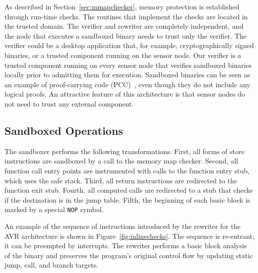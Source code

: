 %
As described in Section~\ref{sec:mmapchecker}, memory protection is
established through run-time checks. 
%
%
The routines that implement the checks are located in the trusted
domain.
%
%
%
The verifier and rewriter are completely independent, and
%
the node that executes a sandboxed binary needs to trust only the
verifier.
%
The verifier could be a desktop application that, for example,
cryptographically signed binaries, or a trusted component running on the
sensor node.
%
%
%
Our verifier is a trusted component running on every sensor
node that verifies sandboxed binaries locally prior to admitting them
for execution.
%
Sandboxed binaries can be seen as an example of proof-carrying code
(PCC)~\cite{necula96pcc}, even though they do not include any logical
proofs.
%
An attractive feature of this architecture is that sensor nodes do not
need to trust any external component.
%
%
\subsection{Sandboxed Operations}
%
The sandboxer performs the following transformations.
%
First, all forms of store instructions are sandboxed by a call to the
memory map checker.
%
Second, all function call entry points are instrumented with calls to
the function entry stub, which uses the safe stack.
%
Third, all return instructions are redirected to the function exit stub.
%
Fourth, all computed calls are redirected to a stub that checks if
the destination is in the jump table.
%
Fifth, the beginning of each basic block is marked by a special
\texttt{NOP} symbol.
%

An example of the sequence of instructions introduced by the rewriter for
the AVR architecture is shown in Figure~\ref{fig:inlinechecks}.
%
The sequence is re-entrant; it can be preempted by interrupts.
%
%
%
The rewriter performs a basic block analysis of the binary and preserves
the program's original control flow by updating static jump, call, and
branch targets.

